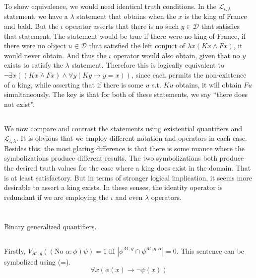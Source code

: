 \documentclass{article}
\begin{document}
    To show equivalence, we would need identical truth conditions. In the $\mathscr{L}_{\iota, \lambda}$ statement, we have a $\lambda$ statement that obtains when the $x$ is the king of France and bald.
    But the $\iota$ operator asserts that there is no such $y \in \mathscr{D}$ that satisfies that statement. 
    The statement would be true if there were no king of France, if there were no object $u \in \mathscr{D}$ that satisfied the left conjuct of $\lambda x(Kx \wedge Fx)$, it would never obtain.
    And thus the $\iota$ operator would also obtain, given that no $y$ exists to satisfy the $\lambda$ statement.
    Therefore this is logically equivalent to $\lnot \exists x ((Kx \wedge Fx) \wedge \forall y(Ky \rightarrow y = x))$, since each permits the non-existence of a king, 
    while asserting that if there is some $u$ s.t. $Ku$ obtains, it will obtain $Fu$ simultaneously. The key is that for both of these statements, we say ``there does not exist''.

    \subsection{}
    We now compare and contrast the statements using existential quantifiers and $\mathscr{L}_{\iota, \lambda}$.
    It is obvious that we employ different notation and operators in each case. Besides this, the most glaring difference is that there is some nuance where the symbolizations produce different results.
    The two symbolizations both produce the desired truth values for the case where a king does exist in the domain. That is at least satisfactory.
    But in terms of stronger logical implication, it seems more desirable to assert a king exists.
    In these senses, the identity operator is redundant if we are employing the $\iota$ and even $\lambda$ operators.

    \section{}
    Binary generalized quantifiers.

    \subsection{}

    Firstly, $V_{\mathscr{M}, g}((\text{No } \alpha : \phi)\psi) = 1$ iff $|\phi^{\mathscr{M}, g} \cap \psi^{\mathscr{M}, g, \alpha}| = 0$.
    This sentence can be symbolized using (=).
    $$\forall x (\phi(x) \rightarrow \lnot \psi(x))$$
\end{document}
